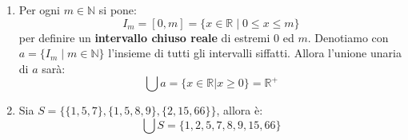 
\begin{example}
\begin{enumerate}
	\item Per ogni $m \in \mathbb{N}$ si pone:
\begin{displaymath}
	I_{m} = [0,m] = \{ x \in \mathbb{R} \; | \; 0 \leq x \leq m \}
\end{displaymath}
per definire un \textbf{intervallo chiuso reale} di estremi $0$ ed $m$. Denotiamo con $a= \{I_{m} \; | \; m \in \mathbb{N} \}$ l'insieme di tutti gli intervalli siffatti. Allora l'unione unaria di $a$ sarà:
\begin{displaymath}
	\bigcup a = \{x \in \mathbb{R} | x \geq 0 \} = \mathbb{R}^{+}
\end{displaymath}
\item Sia $S = \{\{1,5,7\},\{1,5,8,9\},\{2,15,66\}\}$, allora è:
\begin{displaymath}
	\bigcup S = \{1,2,5,7,8,9,15,66\}
\end{displaymath}
\end{enumerate}
\end{example}



